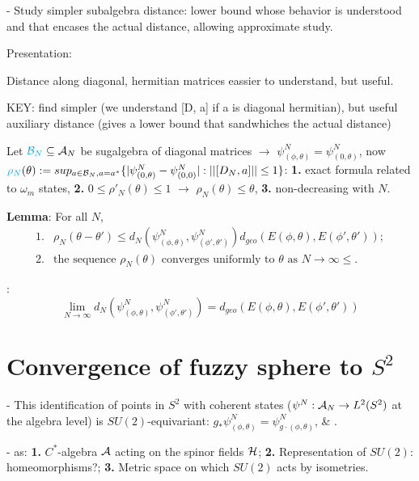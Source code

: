{\color{gray} 
 - Study simpler subalgebra distance: lower bound whose behavior is understood and that encases the actual distance, allowing approximate study.

Presentation:

Distance along diagonal, hermitian matrices eassier to understand, but useful.

 KEY: find simpler (we understand [D, a] if a is diagonal hermitian), but useful auxiliary distance (gives a lower bound that sandwhiches the actual distance)
 
Let $\textcolor{cyan}{\mathcal B_N} \subseteq \mathcal A_N$ be sugalgebra of diagonal matrices $\xrightarrow{}$ $\psi^N_{(\phi, \theta)} = \psi^N_{(0, \theta)}$, now 
$\textcolor{cyan}{\rho_N}(\theta) := sup_{a \in \mathcal B_N, a = a^*}\{|\psi^N_{(0, \theta)} - \psi^N_{(0, 0)}| : ||[D_N, a]|| \leq 1\}$: \textbf{1.} exact formula related to $\omega_m$ states, \textbf{2.} $0 \leq \rho'_N(\theta) \leq 1$ $\xrightarrow{}$ $\rho_N(\theta) \leq \theta$, \textbf{3.} non-decreasing with $N$.


\textbf{Lemma}: For all $N$, 
\begin{align*}
    1.& \rho_N(\theta - \theta') \leq d_N(\psi^N_{(\phi, \theta)}, \psi^N_{(\phi', \theta')}) d_{geo}(E(\phi, \theta), E(\phi', \theta'))  ; \\
    2.& \text{the sequence $\rho_N(\theta)$ converges uniformly to $\theta$ as $N\to \infty$} \leq .
\end{align*}

\textbf{}:  
\begin{equation}
        \lim_{N \to \infty} d_N(\psi^N_{(\phi, \theta)}, \psi^N_{(\phi', \theta')}) = d_{geo}(E(\phi, \theta), E(\phi', \theta'))
\end{equation}
}

\linea


\section{Convergence of fuzzy sphere to $S^2$}\label{FSsec:convergence}

{\color{gray} 
 - This identification of points in $S^2$ with coherent states ($\psi^N: \mathcal A_N \to L^2(S^2)$ at the algebra level) 
is $SU(2)$-equivariant: $g_* \psi^N_{(\phi, \theta)} = \psi^N_{g\cdot (\phi, \theta)}$, \& .
 
 - as: \textbf{1.} $C^*$-algebra $\mathcal A$ acting on the spinor fields $\mathcal H$; \textbf{2.} Representation of $SU(2)$: homeomorphisms?; \textbf{3.}  Metric space on which $SU(2)$ acts by isometries.

}